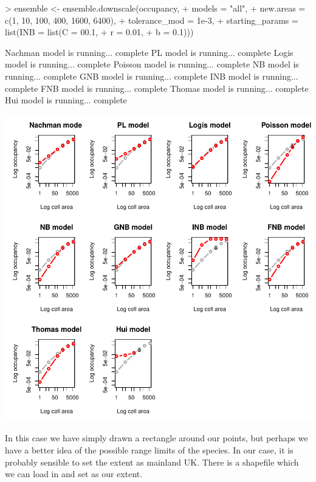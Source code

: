 \documentclass{article}[12pt, a4paper]
\begin{document}
\begin{Schunk}
\begin{Sinput}
> ensemble <- ensemble.downscale(occupancy,
+                                models = "all",
+                                new.areas = c(1, 10, 100, 400, 1600, 6400),
+                                tolerance_mod = 1e-3,
+                                starting_params = list(INB = list(C = 00.1, 
+                                                                  r = 0.01, 
+                                                                  b = 0.1)))
\end{Sinput}
\begin{Soutput}
Nachman model is running...  complete 
PL model is running...  complete 
Logis model is running...  complete 
Poisson model is running...  complete 
NB model is running...  complete 
GNB model is running...  complete 
INB model is running...  complete 
FNB model is running...  complete 
Thomas model is running...  complete 
Hui model is running...  complete 

\end{Soutput}
\end{Schunk}
\includegraphics{Downscaling-downscale36}

In this case we have simply drawn a rectangle around our points, but perhaps we have a better idea of the possible range limits of the species. In our case, it is probably sensible to set the extent as mainland UK. There is a shapefile which we can load in and set as our extent.
\end{document}

